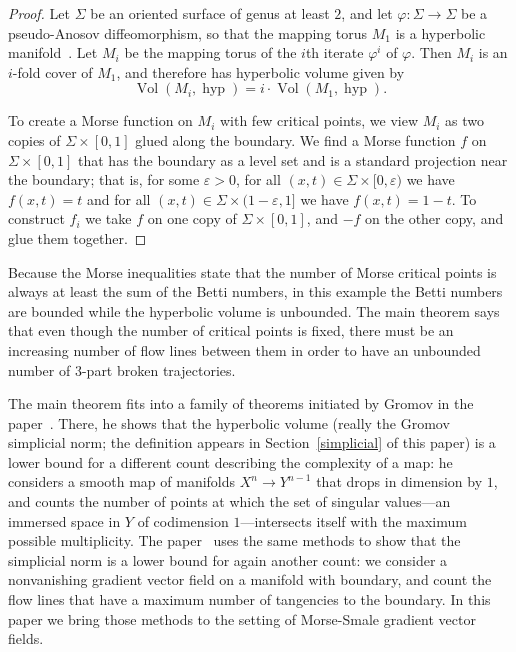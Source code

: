 \documentclass[psamsfonts]{amsart}
\theoremstyle{remark}
\DeclareMathOperator{\Vol}{Vol}
\DeclareMathOperator{\hyp}{hyp}
\begin{document}
\begin{proof}
Let $\Sigma$ be an oriented surface of genus at least $2$, and let $\varphi : \Sigma \rightarrow \Sigma$ be a pseudo-Anosov diffeomorphism, so that the mapping torus $M_1$ is a hyperbolic manifold~\cite{Thurston98}.  Let $M_i$ be the mapping torus of the $i$th iterate $\varphi^i$ of $\varphi$.  Then $M_i$ is an $i$-fold cover of $M_1$, and therefore has hyperbolic volume given by
\[\Vol(M_i, \hyp) = i \cdot \Vol(M_1, \hyp).\]

To create a Morse function on $M_i$ with few critical points, we view $M_i$ as two copies of $\Sigma \times [0, 1]$ glued along the boundary.  We find a Morse function $f$ on $\Sigma \times [0, 1]$ that has the boundary as a level set and is a standard projection near the boundary; that is, for some $\varepsilon > 0$, for all $(x, t) \in \Sigma \times [0, \varepsilon)$ we have $f(x, t) = t$ and for all $(x, t) \in \Sigma \times (1-\varepsilon, 1]$ we have $f(x, t) = 1-t$.  To construct $f_i$ we take $f$ on one copy of $\Sigma \times [0, 1]$, and $-f$ on the other copy, and glue them together.
\end{proof}

Because the Morse inequalities state that the number of Morse critical points is always at least the sum of the Betti numbers, in this example the Betti numbers are bounded while the hyperbolic volume is unbounded.  The main theorem says that even though the number of critical points is fixed, there must be an increasing number of flow lines between them in order to have an unbounded number of $3$-part broken trajectories.

The main theorem fits into a family of theorems initiated by Gromov in the paper~\cite{Gromov09}.  There, he shows that the hyperbolic volume (really the Gromov simplicial norm; the definition appears in Section~\ref{simplicial} of this paper) is a lower bound for a different count describing the complexity of a map: he considers a smooth map of manifolds $X^n \rightarrow Y^{n-1}$ that drops in dimension by $1$, and counts the number of points at which the set of singular values---an immersed space in $Y$ of codimension $1$---intersects itself with the maximum possible multiplicity.  The paper~\cite{Alpert15} uses the same methods to show that the simplicial norm is a lower bound for again another count: we consider a nonvanishing gradient vector field on a manifold with boundary, and count the flow lines that have a maximum number of tangencies to the boundary.  In this paper we bring those methods to the setting of Morse-Smale gradient vector fields.
\end{document}
